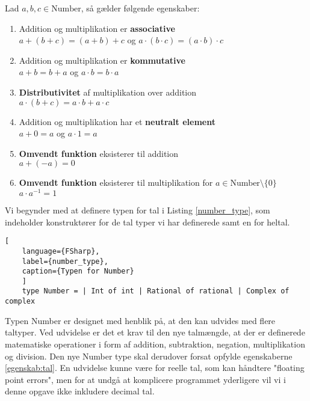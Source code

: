 \vspace{0.5cm}
\begin{egenskab}\label{egenskab:tal}
  Lad $a, b, c \in \text{Number}$, så gælder følgende egenskaber:
  \begin{enumerate}
    \item Addition og multiplikation er \textbf{associative} \\ $a + (b + c) = (a + b) + c$ og $a \cdot (b \cdot c) = (a \cdot b) \cdot c$
    \item Addition og multiplikation er \textbf{kommutative} \\ $a + b = b + a$ og $a \cdot b = b \cdot a$
    \item \textbf{Distributivitet} af multiplikation over addition \\ $a \cdot (b + c) = a \cdot b + a \cdot c$
    \item Addition og multiplikation har et \textbf{neutralt element} \\ $a + 0 = a$ og $a \cdot 1 = a$
    \item \textbf{Omvendt funktion} eksisterer til addition \\ $a + (-a) = 0$
    \item \textbf{Omvendt funktion} eksisterer til multiplikation for $a \in \text{Number} \setminus \{0\}$ \\ $a \cdot a^{-1} = 1$
\end{enumerate}
\end{egenskab}
  

Vi begynder med at definere typen for tal i Listing \ref{number_type}, som indeholder konstruktører for de tal typer vi har definerede samt en for heltal. 

\begin{lstlisting}[
    language={FSharp}, 
    label={number_type}, 
    caption={Typen for Number}
    ]
    type Number = | Int of int | Rational of rational | Complex of complex
\end{lstlisting}

Typen Number er designet med henblik på, at den kan udvides med flere taltyper. Ved udvidelse er det et krav til den nye talmængde, at der er definerede matematiske operationer i form af addition, subtraktion, negation, multiplikation og division. Den nye Number type skal derudover forsat opfylde egenskaberne \ref{egenskab:tal}. En udvidelse kunne være for reelle tal, som kan håndtere "floating point errors", men for at undgå at komplicere programmet yderligere vil vi i denne opgave ikke inkludere decimal tal.


